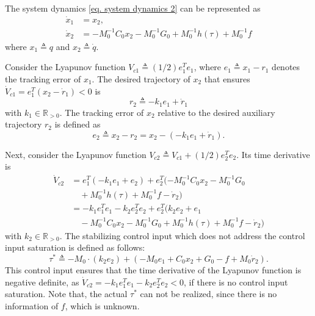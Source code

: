 \documentclass[lettersize,journal]{IEEEtran}
\begin{document}
The system dynamics \eqref{eq. system dynamics 2} can be represented as
\begin{equation}
    \begin{aligned}
        \dot x_1 &= x_2,\\
        \dot x_2 &= -M_0^{-1} C_0 x_2-M_0^{-1} G_0+M_0^{-1} h(\tau) + M_0^{-1} f
    \end{aligned}
    \label{eq. x dynamics}
\end{equation}
where $x_1\triangleq q$ and $x_2\triangleq \dot q$.

Consider the Lyapunov function $V_{c1}\triangleq(1/2)e_1^T  e_1$, where $e_1\triangleq x_1-r_1$ denotes the tracking error of $x_1$. 
The desired trajectory of $x_2$ that ensures $\dot V_{c1}=e_1^T  (x_2-\dot r_1)<0$ is 
\begin{equation}
    r_2 \triangleq -k_1e_1 + \dot r_1
\end{equation}
with $k_1 \in\mathbb{R}_{>0}$. The tracking error of $x_2$ relative to the desired auxiliary trajectory $r_2$ is defined as
\begin{equation}
    e_2 \triangleq x_2 - r_2 = x_2 - (-k_1e_1 + \dot r_1).
    \label{eq. e2}
\end{equation}

Next, consider the Lyapunov function $V_{c2}\triangleq V_{c1} + (1/2) e_2^T  e_2$.
Its time derivative is
\begin{equation}
    \begin{aligned}
    \dot V_{c2} &=
    e_1^T  (-k_1e_1+e_2) +e_2^T  (-M_0^{-1} C _0x_2 -M_0^{-1} G_0\\
    &\quad
    +M_0^{-1}h(\tau)+M_0^{-1} f- \dot r_2)\\
    &= -k_1e_1^T  e_1 -k_2e_2^T  e_2 +e_2^T  (k_2e_2+e_1\\
    &\quad-M_0^{-1} C_0x_2 -M_0^{-1} G_0+M_0^{-1} h(\tau)+M_0^{-1} f- \dot r_2 )
    \end{aligned}
\end{equation}
with $k_2\in\mathbb{R}_{>0}$. 
The stabilizing     control input which does not address the control input saturation is defined as follows:
\begin{equation}
    \tau^* \triangleq-M_0\cdot (k_2e_2)+ 
    ( 
        -M_0e_1+C_0x_2+G_0-f+M_0 \dot r_2
    ).
    \label{eq. desired control}
\end{equation}
This control input ensures that the time derivative of the Lyapunov function is negative definite, as $\dot V_{c2} = -k_1e_1^T  e_1-k_2e_2^T  e_2<0$, if there is no control input saturation.
Note that, the actual $\tau^*$ can not be realized, since there is no information of $f$, which is unknown.
\end{document}
